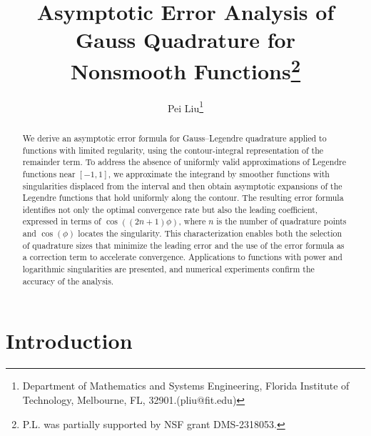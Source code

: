 \documentclass[11pt]{article}
\begin{document}
\title{Asymptotic Error Analysis of Gauss Quadrature for \\ Nonsmooth Functions\thanks{P.L. was partially supported by NSF grant DMS-2318053.}}

\author{Pei Liu\thanks{Department of Mathematics and Systems Engineering, Florida Institute of Technology, Melbourne, FL, 32901.(pliu@fit.edu)}
}

\date{}
\maketitle


\begin{abstract}
We derive an asymptotic error formula for Gauss--Legendre quadrature applied to functions with limited regularity, using the contour-integral representation of the remainder term. To address the absence of uniformly valid approximations of Legendre functions near $[-1,1]$, we approximate the integrand by smoother functions with singularities displaced from the interval and then obtain asymptotic expansions of the Legendre functions that hold uniformly along the contour. The resulting error formula identifies not only the optimal convergence rate but also the leading coefficient, expressed in terms of $\cos((2n+1)\phi)$, where $n$ is the number of quadrature points and $\cos(\phi)$ locates the singularity. This characterization enables both the selection of quadrature sizes that minimize the leading error and the use of the error formula as a correction term to accelerate convergence. Applications to functions with power and logarithmic singularities are presented, and numerical experiments confirm the accuracy of the analysis.
\end{abstract}

\section{Introduction}\label{sec:introduction}
\end{document}
